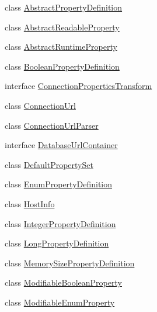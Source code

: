 \begin{DoxyCompactItemize}
\item 
class \mbox{\hyperlink{classcom_1_1mysql_1_1cj_1_1conf_1_1_abstract_property_definition}{Abstract\+Property\+Definition}}
\item 
class \mbox{\hyperlink{classcom_1_1mysql_1_1cj_1_1conf_1_1_abstract_readable_property}{Abstract\+Readable\+Property}}
\item 
class \mbox{\hyperlink{classcom_1_1mysql_1_1cj_1_1conf_1_1_abstract_runtime_property}{Abstract\+Runtime\+Property}}
\item 
class \mbox{\hyperlink{classcom_1_1mysql_1_1cj_1_1conf_1_1_boolean_property_definition}{Boolean\+Property\+Definition}}
\item 
interface \mbox{\hyperlink{interfacecom_1_1mysql_1_1cj_1_1conf_1_1_connection_properties_transform}{Connection\+Properties\+Transform}}
\item 
class \mbox{\hyperlink{classcom_1_1mysql_1_1cj_1_1conf_1_1_connection_url}{Connection\+Url}}
\item 
class \mbox{\hyperlink{classcom_1_1mysql_1_1cj_1_1conf_1_1_connection_url_parser}{Connection\+Url\+Parser}}
\item 
interface \mbox{\hyperlink{interfacecom_1_1mysql_1_1cj_1_1conf_1_1_database_url_container}{Database\+Url\+Container}}
\item 
class \mbox{\hyperlink{classcom_1_1mysql_1_1cj_1_1conf_1_1_default_property_set}{Default\+Property\+Set}}
\item 
class \mbox{\hyperlink{classcom_1_1mysql_1_1cj_1_1conf_1_1_enum_property_definition}{Enum\+Property\+Definition}}
\item 
class \mbox{\hyperlink{classcom_1_1mysql_1_1cj_1_1conf_1_1_host_info}{Host\+Info}}
\item 
class \mbox{\hyperlink{classcom_1_1mysql_1_1cj_1_1conf_1_1_integer_property_definition}{Integer\+Property\+Definition}}
\item 
class \mbox{\hyperlink{classcom_1_1mysql_1_1cj_1_1conf_1_1_long_property_definition}{Long\+Property\+Definition}}
\item 
class \mbox{\hyperlink{classcom_1_1mysql_1_1cj_1_1conf_1_1_memory_size_property_definition}{Memory\+Size\+Property\+Definition}}
\item 
class \mbox{\hyperlink{classcom_1_1mysql_1_1cj_1_1conf_1_1_modifiable_boolean_property}{Modifiable\+Boolean\+Property}}
\item 
class \mbox{\hyperlink{classcom_1_1mysql_1_1cj_1_1conf_1_1_modifiable_enum_property}{Modifiable\+Enum\+Property}}

\end{DoxyCompactItemize}
